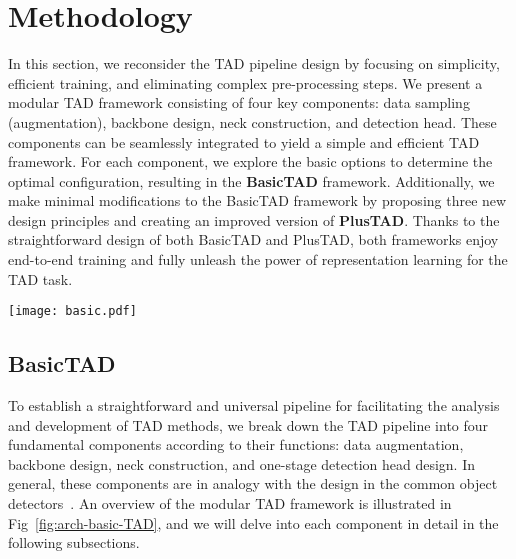 \documentclass[a4paper,fleqn]{cas-dc}
\begin{document}
\section{Methodology}
\label{sec:methodology}
In this section, we reconsider the TAD pipeline design by focusing on simplicity, efficient training, and eliminating complex pre-processing steps.
We present a modular TAD framework consisting of four key components: data sampling (augmentation), backbone design, neck construction, and detection head. These components can be seamlessly integrated to yield a simple and efficient TAD framework. 
For each component, we explore the basic options to determine the optimal configuration, resulting in the {\bf BasicTAD} framework. Additionally, we make minimal modifications to the BasicTAD framework by proposing three new design principles and creating an improved version of {\bf PlusTAD}. Thanks to the straightforward design of both BasicTAD and PlusTAD, both frameworks enjoy end-to-end training and fully unleash the power of representation learning for the TAD task.

\begin{figure*}[!t]
  \texttt{[image: basic.pdf]}
  \caption{
\textbf{BasicTAD Pipeline.}
Our BasicTAD exhibits a modular design framework for the TAD task, composed of data sampling (augmentation), backbone, neck, and detection head.
(a) The backbone is a spatial-temporal network to extract temporal features.
(b) The neck module of BasicTAD offers three different ways of construction to leverage the extracted features. In the neck module,  means the number of stages in the backbone, and stage  is the last stage of the backbone. Stage  contains extra pooling operations on stage  to construct a temporal feature with low temporal resolution. Particularly,  represents adding two features. As the temporal dimension of features varies across different scales, we interpolate the high-level features along the temporal dimension to align them with the low-level features before addition. (c) We adopt a typical one-stage network as the detection head, implemented by anchor-based and anchor-free methods. 
}
  \label{fig:arch-basic-TAD}
\end{figure*}

\subsection{BasicTAD}
 \label{basictad}
\label{sec:basictad}
To establish a straightforward and universal pipeline for facilitating the analysis and development of TAD methods, we break down the TAD pipeline into four fundamental components according to their functions: data augmentation, backbone design, neck construction, and one-stage detection head design. In general, these components are in analogy with the design in the common object detectors~\citep{fcos, retina}. An overview of the modular TAD framework is illustrated in Fig~\ref{fig:arch-basic-TAD}, and we will delve into each component in detail in the following subsections.
\end{document}
